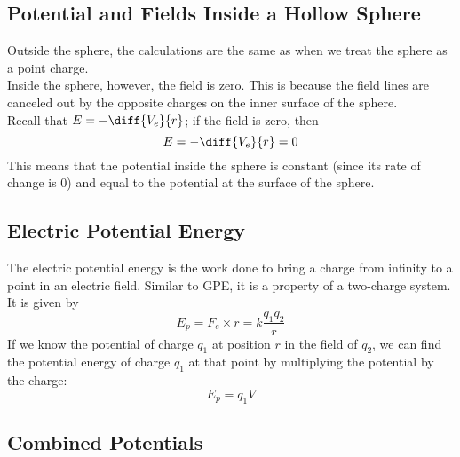 \documentclass[a4paper,12pt]{article}
\newcommand{\lb}{\\[8pt]}
\begin{document}
\pagebreak

\subsection{Potential and Fields Inside a Hollow Sphere}

Outside the sphere, the calculations are the same as when we treat the sphere as a point charge.\lb
Inside the sphere, however, the field is zero. This is because the field lines are canceled out by the opposite charges on the inner surface of the sphere.\lb
Recall that $E = -\diff{V_e}{r}$; if the field is zero, then $$E = -\diff{V_e}{r} = 0$$
This means that the potential inside the sphere is constant (since its rate of change is 0) and equal to the potential at the surface of the sphere.

\pagebreak

\subsection{Electric Potential Energy}

The electric potential energy is the work done to bring a charge from infinity to a point in an electric field. Similar to GPE, it is a property of a two-charge system. It is given by
\begin{equation}\label{eq:epe}
  E_p = F_e\times r = k\frac{q_1q_2}{r}
\end{equation}
If we know the potential of charge $q_1$ at position $r$ in the field of $q_2$, we can find the potential energy of charge $q_1$ at that point by multiplying the potential by the charge:
\begin{equation}\label{eq:epe2}
  E_p = q_1V
\end{equation}

\pagebreak

\subsection{Combined Potentials}
\end{document}
